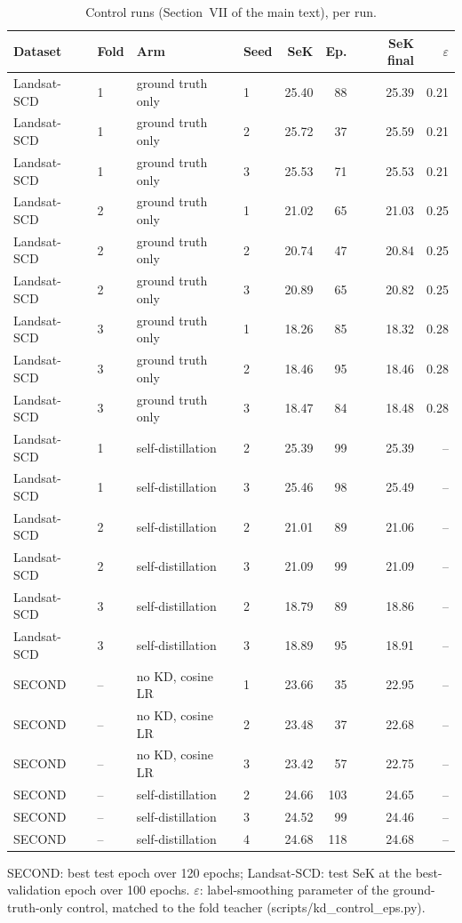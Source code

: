 \begin{table}[!t]
\centering
\footnotesize
\caption{Control runs (Section~VII of the main text), per run.}
\label{tab:s-controls-runs}
\begin{tabular}{llllrrrr}
\toprule
Dataset & Fold & Arm & Seed & SeK & Ep. & SeK final & $\varepsilon$ \\
\midrule
Landsat-SCD & 1 & ground truth only & 1 & 25.40 & 88 & 25.39 & 0.21 \\
Landsat-SCD & 1 & ground truth only & 2 & 25.72 & 37 & 25.59 & 0.21 \\
Landsat-SCD & 1 & ground truth only & 3 & 25.53 & 71 & 25.53 & 0.21 \\
Landsat-SCD & 2 & ground truth only & 1 & 21.02 & 65 & 21.03 & 0.25 \\
Landsat-SCD & 2 & ground truth only & 2 & 20.74 & 47 & 20.84 & 0.25 \\
Landsat-SCD & 2 & ground truth only & 3 & 20.89 & 65 & 20.82 & 0.25 \\
Landsat-SCD & 3 & ground truth only & 1 & 18.26 & 85 & 18.32 & 0.28 \\
Landsat-SCD & 3 & ground truth only & 2 & 18.46 & 95 & 18.46 & 0.28 \\
Landsat-SCD & 3 & ground truth only & 3 & 18.47 & 84 & 18.48 & 0.28 \\
Landsat-SCD & 1 & self-distillation & 2 & 25.39 & 99 & 25.39 & -- \\
Landsat-SCD & 1 & self-distillation & 3 & 25.46 & 98 & 25.49 & -- \\
Landsat-SCD & 2 & self-distillation & 2 & 21.01 & 89 & 21.06 & -- \\
Landsat-SCD & 2 & self-distillation & 3 & 21.09 & 99 & 21.09 & -- \\
Landsat-SCD & 3 & self-distillation & 2 & 18.79 & 89 & 18.86 & -- \\
Landsat-SCD & 3 & self-distillation & 3 & 18.89 & 95 & 18.91 & -- \\
SECOND & -- & no KD, cosine LR & 1 & 23.66 & 35 & 22.95 & -- \\
SECOND & -- & no KD, cosine LR & 2 & 23.48 & 37 & 22.68 & -- \\
SECOND & -- & no KD, cosine LR & 3 & 23.42 & 57 & 22.75 & -- \\
SECOND & -- & self-distillation & 2 & 24.66 & 103 & 24.65 & -- \\
SECOND & -- & self-distillation & 3 & 24.52 & 99 & 24.46 & -- \\
SECOND & -- & self-distillation & 4 & 24.68 & 118 & 24.68 & -- \\
\bottomrule
\end{tabular}
\par\smallskip\parbox{\linewidth}{\scriptsize SECOND: best test epoch over 120 epochs; Landsat-SCD: test SeK at the best-validation epoch over 100 epochs. $\varepsilon$: label-smoothing parameter of the ground-truth-only control, matched to the fold teacher (scripts/kd\_control\_eps.py).}
\end{table}
